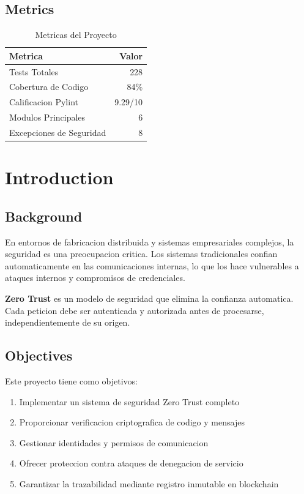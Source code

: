 \documentclass[12pt,a4paper]{report}
\begin{document}
\section{Metrics}

\begin{table}[H]
    \centering
    \begin{tabular}{lr}
        \toprule
        \textbf{Metrica} & \textbf{Valor} \\
        \midrule
        Tests Totales & 228 \\
        Cobertura de Codigo & 84\% \\
        Calificacion Pylint & 9.29/10 \\
        Modulos Principales & 6 \\
        Excepciones de Seguridad & 8 \\
        \bottomrule
    \end{tabular}
    \caption{Metricas del Proyecto}
\end{table}

\cleardoublepage

\chapter{Introduction}
\cleardoublepage

\section{Background}

En entornos de fabricacion distribuida y sistemas empresariales complejos, la seguridad es una preocupacion critica. Los sistemas tradicionales confian automaticamente en las comunicaciones internas, lo que los hace vulnerables a ataques internos y compromisos de credenciales.

\textbf{Zero Trust} es un modelo de seguridad que elimina la confianza automatica. Cada peticion debe ser autenticada y autorizada antes de procesarse, independientemente de su origen.

\section{Objectives}

Este proyecto tiene como objetivos:

\begin{enumerate}
    \item Implementar un sistema de seguridad Zero Trust completo
    \item Proporcionar verificacion criptografica de codigo y mensajes
    \item Gestionar identidades y permisos de comunicacion
    \item Ofrecer proteccion contra ataques de denegacion de servicio
    \item Garantizar la trazabilidad mediante registro inmutable en blockchain
\end{enumerate}
\end{document}

